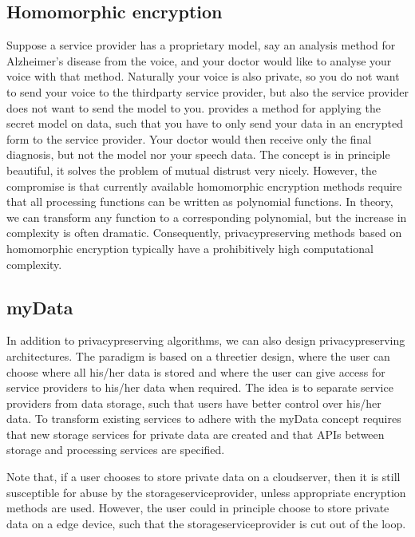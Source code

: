\documentclass[letterpaper,10pt,english]{jupyterBook}
\begin{document}
\subsection{Homomorphic encryption}
\label{\detokenize{Security_and_privacy:homomorphic-encryption}}
\sphinxAtStartPar
Suppose a service provider has a proprietary model, say an analysis
method for Alzheimer’s disease from the voice, and your doctor would
like to analyse your voice with that method. Naturally your voice is
also private, so you do not want to send your voice to the third\sphinxhyphen{}party
service provider, but also the service provider does not want to send
the model to you. 
provides a method for applying the secret model on  data,
such that you have to only send your data in an encrypted form to the
service provider. Your doctor would then receive only the final
diagnosis, but not the model nor your speech data. The concept is in
principle beautiful, it solves the problem of mutual distrust very
nicely. However, the compromise is that currently available homomorphic
encryption methods require that all processing functions can be written
as polynomial functions. In theory, we can transform any function to a
corresponding polynomial, but the increase in complexity is often
dramatic. Consequently, privacy\sphinxhyphen{}preserving methods based on homomorphic
encryption typically have a prohibitively high computational complexity.


\subsection{myData}
\label{\detokenize{Security_and_privacy:mydata}}
\sphinxAtStartPar
In addition to privacy\sphinxhyphen{}preserving algorithms, we can also design
privacy\sphinxhyphen{}preserving architectures. The  paradigm is based on a
three\sphinxhyphen{}tier design, where the user can choose where all his/her data is
stored and where the user can give access for service providers to
his/her data when required. The idea is to separate service providers
from data storage, such that users have better control over his/her
data. To transform existing services to adhere with the myData concept
requires that new storage services for private data are created and that
APIs between storage and processing services are specified.

\sphinxAtStartPar
Note that, if a user chooses to store private data on a cloud\sphinxhyphen{}server,
then it is still susceptible for abuse by the storage\sphinxhyphen{}service\sphinxhyphen{}provider,
unless appropriate encryption methods are used. However, the user could
in principle choose to store private data on a edge device, such that
the storage\sphinxhyphen{}service\sphinxhyphen{}provider is cut out of the loop.
\end{document}
